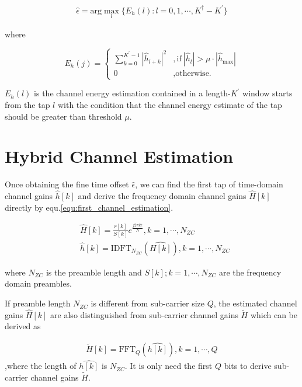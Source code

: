 \begin{align}
\hat{\epsilon} = \text{arg} \max_l \{ E_h(l) : l=0,1, \cdots,  K^{\dag}-K^{\prime} \}
\end{align}

where 

\begin{equation}
E_h(j)=
\left \{
\begin{array}{lr}
            \sum_{k=0}^{K^{\prime}-1} |\hat{h}_{l+k}|^2 &, \text{if} \  |\hat{h}_l| > \mu \cdot |\hat{h}_{\text{max}}|    \\
            0 &, \text{otherwise.} 
\end{array} \right.
\end{equation}

$E_h(l)$ is the channel energy estimation contained in a length-$K^{\prime}$ window starts from the tap $l$ with the condition that the channel energy estimate of the tap should be greater than threshold $\mu$. 

\section{Hybrid Channel Estimation}

Once obtaining the fine time offset $\hat{\epsilon}$, we can find the first tap of time-domain channel gains $\hat{h}[k]$ and derive the frequency domain channel gains $\hat{H}[k]$ directly by equ.\ref{equ:first_channel_estimation}.

\begin{align}
\label{equ:first_channel_estimation}
 & \hat{H}[k] = \frac{r[k]}{S[k]} e^{\frac{j2 \pi k\hat{\epsilon}}{N}}, k = 1,\cdots,N_{ZC} 
\\
 & \hat{h}[k] =  \text{IDFT}_{N_{ZC}} ( \hat{H[k]} ), k = 1,\cdots,N_{ZC} 
\end{align}

where $N_{ZC}$ is the preamble length and $S[k]; k=1, \cdots , N_{ZC}$ are the frequency domain preambles.


If preamble length $N_{ZC}$ is different from sub-carrier size $Q$, the estimated channel gains $\hat{H}[k]$ are also distinguished from sub-carrier channel gains $\tilde{H}$ which can be derived as 

\begin{align}
\tilde{H}[k] =  \text{FFT}_{Q} ( \hat{h[k]} ), k = 1,\cdots,Q 
\end{align}
,where the length of $\hat{h[k]}$ is $N_{ZC}$. It is only need the first $Q$ bits to derive sub-carrier channel gains $\tilde{H}$. 

